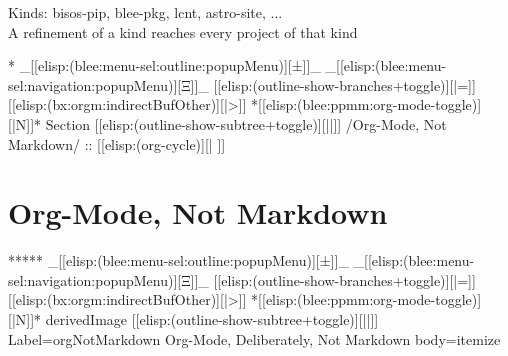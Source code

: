 \begin{whenOrg}
\begin{verblatex}
\begin{frame}[fragile,plain,label=whatIsAiActivity]
  Kinds: bisos-pip, blee-pkg, lcnt, astro-site, ...\\
  A refinement of a kind reaches every project of that kind


\end{frame}
\end{verblatex}



\begin{whenOrg}
*  _[[elisp:(blee:menu-sel:outline:popupMenu)][±]]_ _[[elisp:(blee:menu-sel:navigation:popupMenu)][Ξ]]_ [[elisp:(outline-show-branches+toggle)][|=]] [[elisp:(bx:orgm:indirectBufOther)][|>]] *[[elisp:(blee:ppmm:org-mode-toggle)][|N]]*  Section    [[elisp:(outline-show-subtree+toggle)][||]]   /Org-Mode, Not Markdown/ ::  [[elisp:(org-cycle)][| ]]
\end{whenOrg}

\section{Org-Mode, Not Markdown}

\begin{whenOrg}
*****  _[[elisp:(blee:menu-sel:outline:popupMenu)][±]]_ _[[elisp:(blee:menu-sel:navigation:popupMenu)][Ξ]]_ [[elisp:(outline-show-branches+toggle)][|=]] [[elisp:(bx:orgm:indirectBufOther)][|>]] *[[elisp:(blee:ppmm:org-mode-toggle)][|N]]*  derivedImage [[elisp:(outline-show-subtree+toggle)][||]] Label=orgNotMarkdown Org-Mode, Deliberately, Not Markdown body=itemize
\end{whenOrg}


\end{whenOrg}
